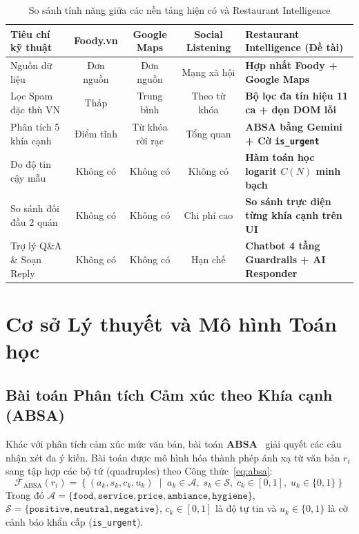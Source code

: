 \documentclass[12pt, a4paper, oneside]{book}
\begin{document}
\begin{table}[H]
\centering
\caption{So sánh tính năng giữa các nền tảng hiện có và Restaurant Intelligence}
\label{tab:comparison}
\vspace{0.15cm}
\footnotesize
\begin{tabularx}{\textwidth}{l c c c X}
\toprule
\rowcolor{blue!8}
\textbf{Tiêu chí kỹ thuật} & \textbf{Foody.vn} & \textbf{Google Maps} & \textbf{Social Listening} & \textbf{Restaurant Intelligence (Đề tài)} \\
\midrule
Nguồn dữ liệu & Đơn nguồn & Đơn nguồn & Mạng xã hội & \textbf{Hợp nhất Foody + Google Maps} \\
Lọc Spam đặc thù VN & Thấp & Trung bình & Theo từ khóa & \textbf{Bộ lọc đa tín hiệu 11 ca + dọn DOM lỗi} \\
Phân tích 5 khía cạnh & Điểm tĩnh & Từ khóa rời rạc & Tổng quan & \textbf{ABSA bằng Gemini + Cờ \texttt{is\_urgent}} \\
Đo độ tin cậy mẫu & Không có & Không có & Không có & \textbf{Hàm toán học logarit $C(N)$ minh bạch} \\
So sánh đối đầu 2 quán & Không có & Không có & Chi phí cao & \textbf{So sánh trực diện từng khía cạnh trên UI} \\
Trợ lý Q\&A \& Soạn Reply & Không có & Không có & Hạn chế & \textbf{Chatbot 4 tầng Guardrails + AI Responder} \\
\bottomrule
\end{tabularx}
\end{table}

\chapter{Cơ sở Lý thuyết và Mô hình Toán học}

\section{Bài toán Phân tích Cảm xúc theo Khía cạnh (ABSA)}
Khác với phân tích cảm xúc mức văn bản, bài toán \textbf{ABSA}~\cite{pontiki2014, zhang2022} giải quyết các câu nhận xét đa ý kiến. Bài toán được mô hình hóa thành phép ánh xạ từ văn bản $r_i$ sang tập hợp các bộ tứ (quadruples) theo Công thức~\eqref{eq:absa}:
\begin{equation}
\label{eq:absa}
    \mathcal{F}_{\text{ABSA}}(r_i) = \left\{ \left( a_k, s_k, c_k, u_k \right) \;\middle|\; a_k \in \mathcal{A},\; s_k \in \mathcal{S},\; c_k \in [0, 1],\; u_k \in \{0, 1\} \right\}
\end{equation}
Trong đó $\mathcal{A} = \{\texttt{food}, \texttt{service}, \texttt{price}, \texttt{ambiance}, \texttt{hygiene}\}$, $\mathcal{S} = \{\texttt{positive}, \texttt{neutral}, \texttt{negative}\}$, $c_k \in [0, 1]$ là độ tự tin và $u_k \in \{0, 1\}$ là cờ cảnh báo khẩn cấp (\texttt{is\_urgent}).
\end{document}
